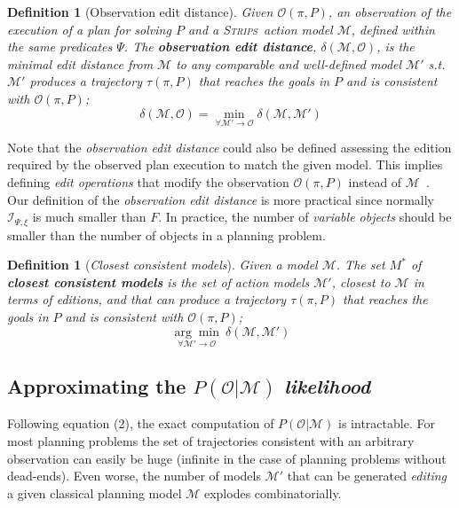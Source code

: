 \documentclass[letterpaper]{article} %
\newcommand{\strips}{\textsc{Strips}}     %
\newtheorem{definition}[theorem]{Definition}
\begin{document}
\begin{definition}[Observation edit distance]
  Given $\mathcal{O}(\pi,P)$, an observation of the execution of a plan for solving $P$ and a \strips\ action model $\mathcal{M}$, defined within the same predicates $\Psi$. The {\bf observation edit distance}, $\delta(\mathcal{M},\mathcal{O})$, is the minimal edit distance from $\mathcal{M}$ to any {\em comparable} and well-defined model $\mathcal{M}'$ s.t. $\mathcal{M}'$ produces a trajectory $\tau(\pi,P)$ that reaches the goals in $P$ and is {\em consistent} with $\mathcal{O}(\pi,P)$; \[\delta(\mathcal{M},\mathcal{O})=\min_{\forall \mathcal{M}' \rightarrow \mathcal{O}} \delta(\mathcal{M},\mathcal{M}')\]
\end{definition}

Note that the {\em observation edit distance} could also be defined assessing the edition required by the observed plan execution to match the given model. This implies defining {\em edit operations} that modify the observation $\mathcal{O}(\pi,P)$ instead of $\mathcal{M}$~\cite{sohrabi:precognition:IJCAI2016}. Our definition of the {\em observation edit distance} is more practical since normally ${\mathcal I}_{\Psi,\xi}$ is much smaller than $F$. In practice, the number of {\em variable objects} should be smaller than the number of objects in a planning problem.

\begin{definition}[{\em Closest consistent models}] \label{consistent}
Given a model $\mathcal{M}$. The set $M^*$ of {\bf closest consistent models} is the set of action models $\mathcal{M}'$, closest to $\mathcal{M}$ in terms of editions, and that can produce a trajectory $\tau(\pi,P)$ that reaches the goals in $P$ and is {\em consistent} with $\mathcal{O}(\pi,P)$;
  \[\underset{\forall \mathcal{M}' \rightarrow \mathcal{O}}{\arg\min}\ \delta(\mathcal{M},\mathcal{M}') \]
\end{definition}

\subsection{Approximating the $P(\mathcal{O}|\mathcal{M})$ {\em likelihood}}
Following equation (2), the exact computation of $P(\mathcal{O}|\mathcal{M})$ is intractable. For most planning problems the set of trajectories consistent with an arbitrary observation can easily be huge (infinite in the case of planning problems without dead-ends). Even worse, the number of models $\mathcal{M}'$ that can be generated {\em editing} a given classical planning model $\mathcal{M}$ explodes combinatorially.
\end{document}
